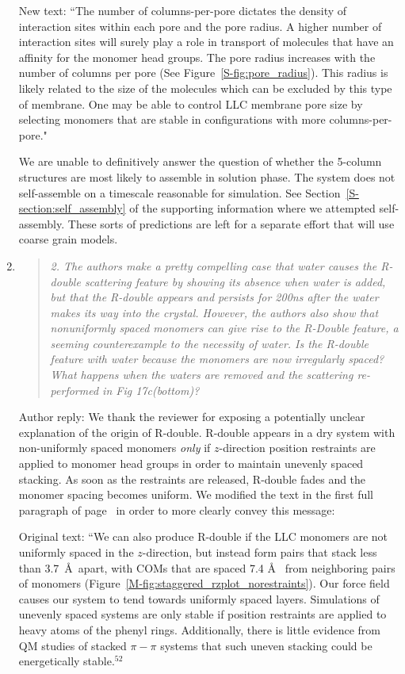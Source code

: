 \documentclass{article}
\begin{document}
\begin{enumerate}
    New text: ``The number of columns-per-pore dictates the density of interaction sites
    within each pore and the pore radius. A higher number of interaction sites will
    surely play a role in transport of molecules that have an affinity for the
    monomer head groups.  The pore radius increases with the number of columns per
    pore (See Figure~\ref{S-fig:pore_radius}). This radius is likely related to the
    size of the molecules which can be excluded by this type of membrane. One may be
    able to control LLC membrane pore size by selecting monomers that are stable in
    configurations with more columns-per-pore."
    
    We are unable to definitively answer the question of whether the 5-column 
    structures are most likely to assemble in solution phase. The system does
    not self-assemble on a timescale reasonable for simulation. See 
    Section~\ref{S-section:self_assembly} of the supporting information where
    we attempted self-assembly. These sorts of predictions are left for 
    a separate effort that will use coarse grain models.
    
    \item \begin{quote}
    \textit{2. The authors make a pretty compelling case that water causes the
    R-double scattering feature by showing its absence when water is added, but
    that the R-double appears and persists for 200ns after the water makes its way
    into the crystal. However, the authors also show that nonuniformly spaced
    monomers can give rise to the R-Double feature, a seeming counterexample to the
    necessity of water.  Is the R-double feature with water because the monomers
    are now irregularly spaced? What happens when the waters are removed and the
    scattering re-performed in Fig 17c(bottom)?}
    \end{quote}
    
    Author reply: We thank the reviewer for exposing a potentially unclear
    explanation of the origin of R-double. R-double appears in a dry system with
    non-uniformly spaced monomers \textit{only} if $z$-direction position
    restraints are applied to monomer head groups in order to maintain unevenly
    spaced stacking. As soon as the restraints are released, R-double fades and the
    monomer spacing becomes uniform. We modified the text in the first full 
    paragraph of page~\pageref{M-modification:rdouble} in order to more clearly
    convey this message:
 
    Original text: ``We can also produce R-double if the LLC monomers are not
    uniformly spaced in the $z$-direction, but instead form pairs that stack less
    than 3.7~\AA~apart, with COMs that are spaced 7.4 \AA~ from neighboring pairs
    of monomers (Figure~\ref{M-fig:staggered_rzplot_norestraints}). Our force field
    causes our system to tend towards uniformly spaced layers. Simulations of
    unevenly spaced systems are only stable if position restraints are applied to
    heavy atoms of the phenyl rings. Additionally, there is little evidence from QM
    studies of stacked $\pi-\pi$ systems that such uneven stacking could be
    energetically stable.$^{52}$%


\end{enumerate}
\end{document}
